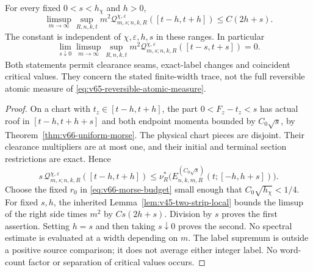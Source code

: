 \begin{theorem}
\label{thm:v66-ordered-collar-trace}
For every fixed $0<s<h_\chi$ and $h>0$,
\begin{equation}\label{eq:v66-ordered-collar-trace}
 \limsup_{m\to\infty}\sup_{R,n,k,t}m^2
 \mathcal Q^{\chi,\varepsilon}_{m,s;n,k,R}([t-h,t+h])
                       \le C(2h+s).
\end{equation}
The constant is independent of $\chi,\varepsilon,h,s$ in these ranges.
In particular
\begin{equation}\label{eq:v66-diagonal-collar-order}
 \lim_{s\downarrow0}\limsup_{m\to\infty}
 \sup_{R,n,k,t}m^2
 \mathcal Q^{\chi,\varepsilon}_{m,s;n,k,R}([t-s,t+s])=0.
\end{equation}
Both statements permit clearance seams, exact-label changes and
coincident critical values. They concern the stated finite-width trace,
not the full reversible atomic measure of
\eqref{eq:v65-reversible-atomic-measure}.
\end{theorem}
\begin{proof}
On a chart with $t_z\in[t-h,t+h]$, the part $0<F_z-t_z<s$ has
actual roof in $[t-h,t+h+s]$ and both endpoint momenta bounded by
$C_0\sqrt{s}$, by Theorem~\ref{thm:v66-uniform-morse}. The physical
chart pieces are disjoint. Their clearance multipliers are at most one,
and their initial and terminal section restrictions are exact. Hence
\begin{equation}\label{eq:v66-positive-trace-comparison}
 s\,\mathcal Q^{\chi,\varepsilon}_{m,s;n,k,R}([t-h,t+h])
 \le\nu_R^*\bigl(E^{(C_0\sqrt s)}_{n,k,m,R}
                                  (t;[-h,h+s])\bigr).
\end{equation}
Choose the fixed $r_0$ in \eqref{eq:v66-morse-budget} small enough
that $C_0\sqrt{h_\chi}<1/4$. For fixed $s,h$, the inherited
Lemma~\ref{lem:v45-two-strip-local} bounds the limsup of the right
side times $m^2$ by $C s(2h+s)$. Division by $s$ proves the first
assertion. Setting $h=s$ and then taking $s\downarrow0$ proves the
second. No spectral estimate is evaluated at a width depending on $m$.
The label supremum is outside a positive source comparison; it does
not average either integer label. No word-count factor or separation
of critical values occurs.
\end{proof}


